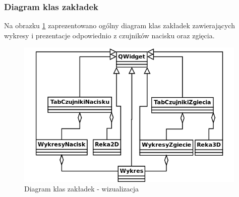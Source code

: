 \documentclass{article}
\begin{document}
\subsubsection{Diagram klas zakładek}
Na obrazku \ref{rys:diagram_klas} zaprezentowano ogólny diagram klas zakładek zawierających wykresy i prezentacje odpowiednio z czujników nacisku oraz zgięcia.
\begin{figure}[H]
    \centering
    \includegraphics[width=11cm]{diagram_klas.png}
    \caption{Diagram klas zakładek - wizualizacja}
    \label{rys:diagram_klas}
\end{figure}
\end{document}
